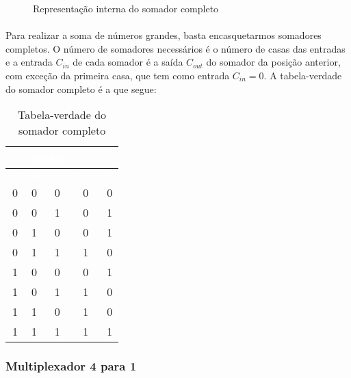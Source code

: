 \documentclass[a4paper,12pt]{article}
\begin{document}
\begin{figure}[H]
    \centering
    
    \caption{Representação interna do somador completo}
    \label{fig:somador_interna}
\end{figure}

\newpage

\paragraph{}
Para realizar a soma de números grandes, basta encasquetarmos somadores completos. O número de somadores necessários é o número de casas das entradas e a entrada $C_{in}$ de cada somador é a saída $C_{out}$ do somador da posição anterior, com exceção da primeira casa, que tem como entrada $C_{in} = 0$. A tabela-verdade do somador completo é a que segue:

\begin{table}[H]
    \centering
    \begin{tabular}{|c|c|c|c|c|}
        \hline
        \rowcolor{black}
        \multicolumn{3}{|c|}{\textbf{\textcolor{white}{Entradas}}} & \multicolumn{2}{|c|}{\textbf{\textcolor{white}{Saídas}}} \\ \hline
        \rowcolor{black}
        \textcolor{white}{$A$} & \textcolor{white}{$B$} & \textcolor{white}{$C_{in}$} & \textcolor{white}{$C_{out}$} & \textcolor{white}{$S$} \\ \hline
        0 & 0 & 0 & 0 & 0 \\ \hline
        \rowcolor{cinza}
        0 & 0 & 1 & 0 & 1 \\ \hline
        0 & 1 & 0 & 0 & 1 \\ \hline
        \rowcolor{cinza}
        0 & 1 & 1 & 1 & 0 \\ \hline
        1 & 0 & 0 & 0 & 1 \\ \hline
        \rowcolor{cinza}
        1 & 0 & 1 & 1 & 0 \\ \hline
        1 & 1 & 0 & 1 & 0 \\ \hline
        \rowcolor{cinza}
        1 & 1 & 1 & 1 & 1 \\ \hline
    \end{tabular}
    \caption{Tabela-verdade do somador completo}
\end{table}

\subsubsection{Multiplexador 4 para 1}
\end{document}
